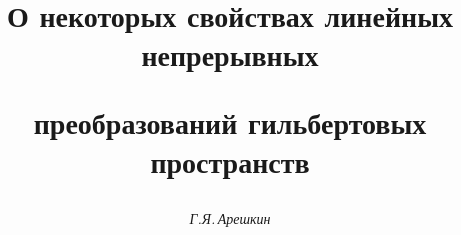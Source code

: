 

 


% 


\newcommand{\Hsqup}{\overset{\,\shortmid@!@!@!@!@!\rule{6.5pt}%


{.2pt}@!@!@!@!@!\shortmid}{H}{}} 


\newcommand{\Hsqdn}{\overset{\,\shortmid@!@!@!@!@!\rule[2.8pt]{6.5pt}%


{.2pt}@!@!@!@!@!\shortmid}{H}{}} 


 


\newcommand{\up}[2]{\overset{\,#1}{#2}{}} 


\newcommand{\tts}[1]{} 


 




\setcounter{page}{29} 












 


\author{\it Г.Я.\,Арешкин} 




\title{О некоторых свойствах линейных непрерывных  


преобразований гильбертовых пространств} 


 


\date{} 




\pagestyle{plain} %


 



